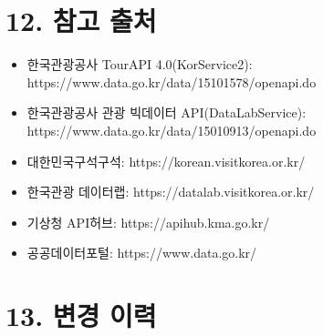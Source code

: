 \documentclass[12pt,a4paper]{article}
\newcommand{\DocNeedspace}[1]{\par\ifdim\dimexpr\pagegoal-\pagetotal\relax<#1\newpage\fi}
\newcommand{\TocNoChildTight}{\vspace{-0.28em}}
\begin{document}
\newpage

\DocNeedspace{10\baselineskip}
\section*{12. 참고 출처}
\addtocontents{toc}{\protect\TocNoChildTight}


\begin{itemize}
\item 한국관광공사 TourAPI 4.0(KorService2): https://www.data.go.kr/data/15101578/openapi.do
\item 한국관광공사 관광 빅데이터 API(DataLabService): https://www.data.go.kr/data/15010913/openapi.do
\item 대한민국구석구석: https://korean.visitkorea.or.kr/
\item 한국관광 데이터랩: https://datalab.visitkorea.or.kr/
\item 기상청 API허브: https://apihub.kma.go.kr/
\item 공공데이터포털: https://www.data.go.kr/
\end{itemize}


\newpage

\DocNeedspace{10\baselineskip}
\section*{13. 변경 이력}
\addtocontents{toc}{\protect\TocNoChildTight}
\end{document}
